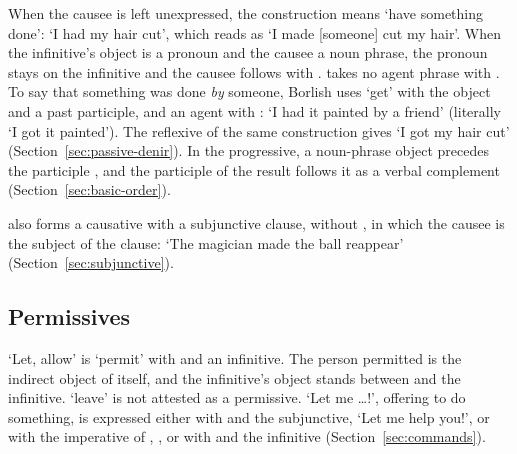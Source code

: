 When the causee is left unexpressed, the construction means `have something done':  `I had my hair cut', which reads as `I made [someone] cut my hair'. When the infinitive's object is a pronoun and the causee a noun phrase, the pronoun stays on the infinitive and the causee follows with .
 takes no agent phrase with . To say that something was done \emph{by} someone, Borlish uses  `get' with the object and a past participle, and an agent with :  `I had it painted by a friend' (literally `I got it painted'). The reflexive of the same construction gives  `I got my hair cut' (Section~\ref{sec:passive-denir}). In the progressive, a noun-phrase object precedes the participle , and the participle of the result follows it as a verbal complement (Section~\ref{sec:basic-order}).

 also forms a causative with a subjunctive clause, without , in which the causee is the subject of the clause:  `The magician made the ball reappear' (Section~\ref{sec:subjunctive}).

\subsection{Permissives}
`Let, allow' is  `permit' with  and an infinitive. The person permitted is the indirect object of  itself, and the infinitive's object stands between  and the infinitive.
 `leave' is not attested as a permissive. `Let me \ldots!', offering to do something, is expressed either with  and the subjunctive,  `Let me help you!', or with the imperative of , , or with  and the infinitive (Section~\ref{sec:commands}).
